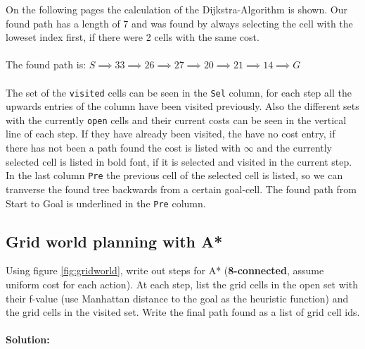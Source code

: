 \documentclass[letta4 paper]{article}
\numberwithin{equation}{section}
\newcommand{\0}{\mathbf{0}}
\begin{document}
	On the following pages the calculation of the Dijkstra-Algorithm is shown. Our found path has a length of 7 and was found by always selecting the cell with the loweset index first, if there were 2 cells with the same cost.
	\\
	\\
	The found path is: $S \implies 33 \implies 26 \implies 27 \implies 20 \implies 21 \implies 14 \implies G$
	\\
	\\
	The set of the \texttt{visited} cells can be seen in the \texttt{Sel} column, for each step all the upwards entries of the column have been visited previously. Also the different sets with the currently \texttt{open} cells and their current costs can be seen in the vertical line of each step. If they have already been visited, the have no cost entry, if there has not been a path found the cost is listed with $\infty$ and the currently selected cell is listed in bold font, if it is selected and visited in the current step. \\
	In the last column \texttt{Pre} the previous cell of the selected cell is listed, so we can tranverse the found tree backwards from a certain goal-cell. The found path from Start to Goal is underlined in the \texttt{Pre} column. 
	
	
	
	\newpage
	
	\subsection{Grid world planning with A*}
	Using figure \ref{fig:gridworld}, write out steps for A* (\textbf{8-connected}, assume uniform cost for each action). At each step, list the grid cells in the open set with their f-value (use Manhattan distance to the goal as the heuristic function) and the grid cells in the visited set. Write the final path found as a list of grid cell ids.\\
	\\
	\textbf{Solution:}\\
	
\end{document}
